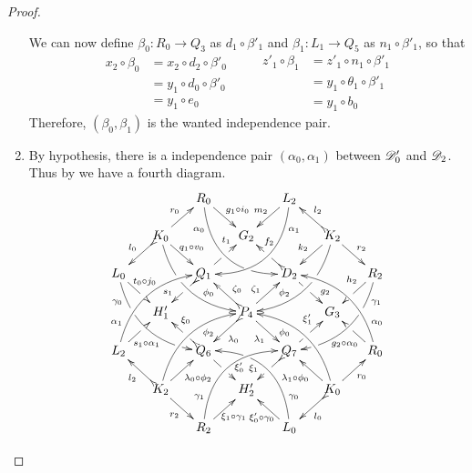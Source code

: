 \begin{proof}
\begin{enumerate}
		We can now define $\beta_0\colon R_0\to Q_3$ as $d_1\circ \beta'_1$ and $\beta_1\colon L_1\to Q_5$ as $n_1\circ \beta'_1$, so that
		\[\begin{split}
				x_2\circ \beta_0 & =x_2\circ d_2\circ \beta'_0 \\&= y_1\circ d_0\circ \beta'_0\\&=y_1\circ e_0
		\end{split} \qquad \begin{split}
z'_1 \circ \beta_1 & = z'_1 \circ n_1\circ \beta'_1\\& =y_1\circ \theta_1\circ \beta'_1\\&=y_1\circ b_0
		\end{split}\]
		Therefore, $(\beta_0, \beta_1)$ is the wanted independence pair.
		\item By hypothesis, there is a independence pair $(\alpha_0, \alpha_1)$ between 	$\mathscr{D}'_0$ and $\mathscr{D}_2$. Thus by  we have a fourth diagram.
		\[\xymatrix@C=15pt@R=15pt{&&R_0 \ar@/_.8cm/[ddrr]_(.2){\alpha_0}|(.7)\hole \ar[dr]^{\hspace{-1pt}g_1\circ i_0}&& L_2\ar@/^.8cm/[ddll]^(.2){\alpha_1}  \ar[dl]_{m_2\hspace{-2pt}}\\
				&K_0\ar[dr]^{\hspace{-4pt}q_1\circ v_0}\ar@{>->}[dl]_{l_0} \ar@/_.6cm/[ddrr]|(.36)\hole^(.65){\phi_0}\ar[ur]^{r_0}&& G_2 && K_2 \ar@/^.6cm/[ddll]|(.36)\hole_(.65){\phi_2}\ar[dl]_{k_2}\ar@{>->}[lu]_{l_2} \ar[dr]^{r_2}\\
				L_0 \ar@/_.6cm/[ddrr]_(.2){\gamma_0}|(.31)\hole|(.81)\hole \ar[dr]^(.4){\hspace{-4pt}t_0\circ j_0}|(.6)\hole && Q_1 \ar@{>->}[dl]|(.4)\hole_(.65){s_1}\ar[ur]|(.5)\hole^(.7){t_1}&&D_2 \ar[dr]|(.4)\hole^(.65){g_2} \ar@{>->}[ul]|(.5)\hole_(.65){f_2}&&R_2\ar@/^.6cm/[ddll]^(.2){\gamma_1}|(.31)\hole|(.81)\hole\ar[dl]_(.35){h_2}|(.6)\hole\\&H'_1 &&P_4\ar[dr]_{\lambda_1} \ar@{>->}[dl]^{\lambda_0}\ar[ur]^(.4){\zeta_1}\ar@{>->}[ul]_(.4){\zeta_0}&&G_3\\
				L_2 \ar@/^.6cm/[uurr]^(.2){\alpha_1} \ar[ur]_(.35){\hspace{-2pt}s_1\circ
					\alpha_1}|(.61)\hole&&Q_6
				\ar@{>->}[ul]|(.4)\hole_(.6){\xi_0}\ar[dr]|(.5)\hole^(.65){\xi'_0}
				&&Q_7\ar[ur]|(.4)\hole^(.6){\xi'_1}
				\ar@{>->}[dl]|(.5)\hole_(.65){\xi_1} && R_0 \ar[ul]^(.35){g_2\circ
					\alpha_0}|(.61)\hole\ar@/_.6cm/[uull]_(.2){\alpha_0}\\&K_2
				\ar[ur]_{\lambda_0\circ \phi_2} \ar[dr]_{r_2}
				\ar@{>->}[ul]^{l_2}\ar@/^.6cm/[uurr]_(.65){\phi_2}&&H'_2&& K_0
				\ar[ur]_{r_0} \ar[ul]^{\lambda_1\circ \phi_0} \ar@{>->}[dl]^{l_0}
				\ar@/_.6cm/[uull]^(.65){\phi_0}\\&& R_2
				\ar[ur]_{\hspace{-5pt}\xi_1\circ
					\gamma_1}\ar@/^.8cm/[uurr]^(.2){\gamma_1}&& L_0
				\ar[ul]^{\xi'_0\circ \gamma_0\hspace{-7pt}}
				\ar@/_.8cm/[uull]_(.2){\gamma_0} |(.69)\hole 
			}	\]
		

\end{enumerate}
\end{proof}
